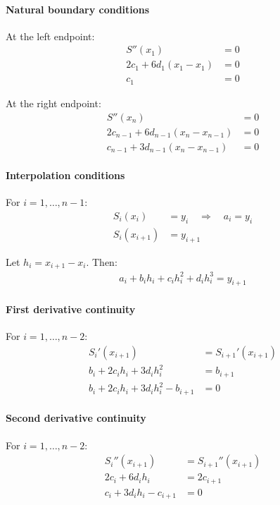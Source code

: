 \documentclass[a4paper,11pt]{article}
\begin{document}
\paragraph{Natural boundary conditions}

At the left endpoint:
\begin{align*}
S''(x_1) &= 0 \\
2c_1 + 6d_1(x_1 - x_1) &= 0 \\
c_1 &= 0
\end{align*}

At the right endpoint:
\begin{align*}
S''(x_n) &= 0 \\
2c_{n-1} + 6d_{n-1}(x_n - x_{n-1}) &= 0 \\
c_{n-1} + 3d_{n-1}(x_n - x_{n-1}) &= 0
\end{align*}

\paragraph{Interpolation conditions}

For $i = 1, \dots, n-1$:
\begin{align*}
S_i(x_i) &= y_i \quad \Rightarrow \quad a_i = y_i \\
S_i(x_{i+1}) &= y_{i+1}
\end{align*}

Let $h_i = x_{i+1} - x_i$. Then:
\begin{align*}
a_i + b_i h_i + c_i h_i^2 + d_i h_i^3 = y_{i+1}
\end{align*}

\paragraph{First derivative continuity}

For $i = 1, \dots, n-2$:
\begin{align*}
S_i'(x_{i+1}) &= S_{i+1}'(x_{i+1}) \\
b_i + 2c_i h_i + 3d_i h_i^2 &= b_{i+1} \\
b_i + 2c_i h_i + 3d_i h_i^2 - b_{i+1} &= 0
\end{align*}

\paragraph{Second derivative continuity}

For $i = 1, \dots, n-2$:
\begin{align*}
S_i''(x_{i+1}) &= S_{i+1}''(x_{i+1}) \\
2c_i + 6d_i h_i &= 2c_{i+1} \\
c_i + 3d_i h_i - c_{i+1} &= 0
\end{align*}
\end{document}
